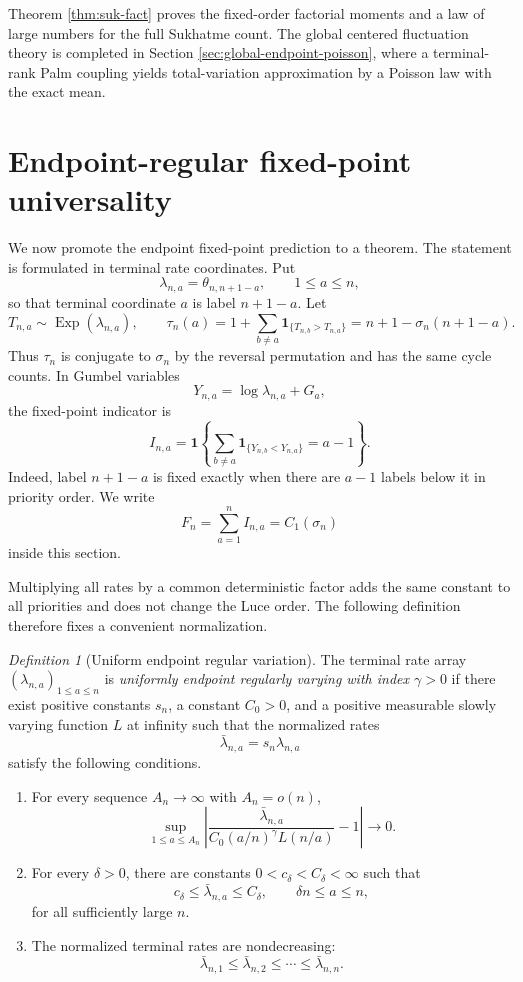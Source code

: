 \documentclass[11pt]{article}
\theoremstyle{remark}
\newtheorem{definition}[theorem]{Definition}
\newcommand{\one}{\mathbf 1}
\newcommand{\Exp}{\operatorname{Exp}}
\begin{document}
Theorem \ref{thm:suk-fact} proves the fixed-order factorial moments and a law of large numbers for the full Sukhatme count.  The global centered fluctuation theory is completed in Section \ref{sec:global-endpoint-poisson}, where a terminal-rank Palm coupling yields total-variation approximation by a Poisson law with the exact mean.


\section{Endpoint-regular fixed-point universality}\label{sec:endpoint-fixed-universality}

We now promote the endpoint fixed-point prediction to a theorem.  The statement
is formulated in terminal rate coordinates.  Put
\[
        \lambda_{n,a}=\theta_{n,n+1-a},
        \qquad 1\le a\le n,
\]
so that terminal coordinate \(a\) is label \(n+1-a\).  Let
\[
        T_{n,a}\sim\Exp(\lambda_{n,a}),
        \qquad
        \tau_n(a)=1+\sum_{b\ne a}\one_{\{T_{n,b}>T_{n,a}\}}
        =n+1-\sigma_n(n+1-a).
\]
Thus $\tau_n$ is conjugate to $\sigma_n$ by the reversal permutation and has
the same cycle counts.  In Gumbel variables
\[
        Y_{n,a}=\log \lambda_{n,a}+G_a,
\]
the fixed-point indicator is
\[
        I_{n,a}=\one\left\{
        \sum_{b\ne a}\one_{\{Y_{n,b}<Y_{n,a}\}}=a-1
        \right\}.
\]
Indeed, label \(n+1-a\) is fixed exactly when there are \(a-1\) labels below
it in priority order.  We write
\[
        F_n=\sum_{a=1}^n I_{n,a}=C_1(\sigma_n)
\]
inside this section.

Multiplying all rates by a common deterministic factor adds the same constant to
all priorities and does not change the Luce order.  The following definition
therefore fixes a convenient normalization.

\begin{definition}[Uniform endpoint regular variation]\label{def:endpoint-rv}
The terminal rate array \((\lambda_{n,a})_{1\le a\le n}\) is
\emph{uniformly endpoint regularly varying with index \(\gamma>0\)} if there
exist positive constants \(s_n\), a constant \(C_0>0\), and a positive
measurable slowly varying function \(L\) at infinity such that the normalized
rates
\[
        \bar\lambda_{n,a}=s_n\lambda_{n,a}
\]
satisfy the following conditions.

\begin{enumerate}[label=(ER\arabic*)]
\item For every sequence \(A_n\to\infty\) with \(A_n=o(n)\),
\[
        \sup_{1\le a\le A_n}
        \left|
        \frac{\bar\lambda_{n,a}}
        {C_0(a/n)^\gamma L(n/a)}-1
        \right|\longrightarrow0.
\]
\item For every \(\delta>0\), there are constants
\(0<c_\delta<C_\delta<\infty\) such that
\[
        c_\delta\le \bar\lambda_{n,a}\le C_\delta,
        \qquad \delta n\le a\le n,
\]
for all sufficiently large \(n\).
\item The normalized terminal rates are nondecreasing:
\[
        \bar\lambda_{n,1}\le\bar\lambda_{n,2}
        \le\cdots\le\bar\lambda_{n,n}.
\]
\end{enumerate}
\end{definition}
\end{document}
